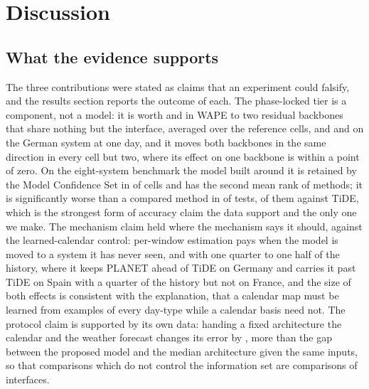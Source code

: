 \section{Discussion}
\label{sec:discussion}

\subsection{What the evidence supports}
The three contributions were stated as claims that an experiment could falsify, and the
results section reports the outcome of each. The phase-locked tier is a component, not a
model: it is worth  and
 in WAPE to two residual backbones that share nothing but
the interface, averaged over the reference cells, and 
and  on the German system at one day, and it moves both backbones in the same direction in every cell but two, where its effect on
one backbone is within a point of zero. On the eight-system benchmark
the model built around it is retained by the Model Confidence Set in
 of  cells and has the second mean rank of
 methods; it is significantly worse than a compared method in
 of  tests,  of them against TiDE, which
is the strongest form of accuracy claim the data support and the only one we make. The
mechanism claim held where the mechanism says it should, against the learned-calendar
control: per-window estimation pays when the model is moved to a system it has never seen,
and with one quarter to one half of the history, where it keeps PLANET ahead of TiDE on
Germany and carries it past TiDE on Spain with a quarter of the history but not on France, and the size of both effects is
consistent with the explanation, that a calendar map must be learned from examples of every
day-type while a calendar basis need not. The protocol claim is supported by its own data:
handing a fixed architecture the calendar and the weather forecast changes its error by
, more than the gap between the proposed model and the
median architecture given the same inputs, so that comparisons which do not control the
information set are comparisons of interfaces.

